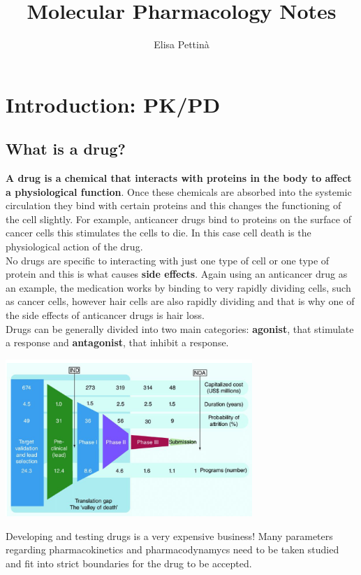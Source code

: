 \documentclass{book}
\title{Molecular Pharmacology Notes}
\author{Elisa Pettinà}
\begin{document}
\maketitle

\chapter{Introduction: PK/PD}
\section{{What is a drug?}}
\textbf{A drug is a chemical that interacts with proteins in the body to affect a physiological function}.
Once these chemicals are absorbed into the systemic circulation they bind with certain proteins and this changes the functioning of the cell slightly. 
For example, anticancer drugs bind to proteins on the surface of cancer cells this stimulates the cells to die. 
In this case cell death is the physiological action of the drug.
\\
No drugs are specific to interacting with just one type of cell or one type of protein
and this is what causes \textbf{side effects}. 
Again using an anticancer drug as an example, the medication works by binding to very rapidly dividing cells, such as cancer cells, however hair cells are also rapidly dividing and that is why one of the side effects of anticancer drugs is hair loss.
\\
Drugs can be generally divided into two main categories: \textbf{agonist}, that stimulate a response and \textbf{antagonist}, that inhibit a response.

\includegraphics[width=0.7\textwidth, center]{images/image.png}

Developing and testing drugs is a very expensive business!
Many parameters regarding pharmacokinetics and pharmacodynamycs need to be taken studied and fit into strict boundaries for the drug to be accepted.
\end{document}
